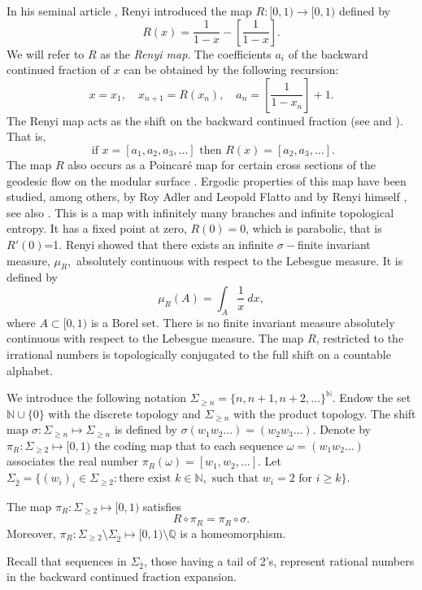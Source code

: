 \documentclass[letterpaper,10pt,reqno]{amsart}
\numberwithin{equation}{section}     %
\newcommand{\N}{\mathbb{N}}
\def\N{{\mathbb N}}
\def\Q{{\mathbb Q}}
\begin{document}
In his seminal article \cite{re}, Renyi  introduced the map $R:[0,1) \to [0,1)$ defined by
\begin{equation}\label{Renyi_form}
R(x)=\frac{1}{1-x} -\left[\frac{1}{1-x} \right].  
\end{equation}
We will refer to $R$ as the \emph{Renyi map}. The coefficients $a_i$ of the backward continued fraction of $x$ can be obtained by the following recursion:
\begin{equation*}
x=x_1,\quad  x_{n+1}=R(x_n),\quad a_n=\left[\frac{1}{1-x_n}\right]+1.
\end{equation*}
The Renyi map acts as the shift on the backward continued fraction (see \cite{ka} and \cite[Chapter 11]{dk}). That is, 
\begin{equation*}
\textrm{ if } x =[a_1, a_2, a_3, \dots] \textrm{ then } R(x)=[a_2, a_3, \dots].
\end{equation*}
The map $R$ also occurs as a Poincar\'e map for certain cross sections of the geodesic flow on the modular surface \cite{af,ka}.  Ergodic properties of this map have been studied, among others, by Roy Adler and Leopold Flatto \cite{af} and by Renyi himself \cite{re}, see also \cite{gh,i1}. This is a map with infinitely many branches and infinite topological entropy. It has a  fixed point at zero, $R(0)=0$, which is parabolic, that is $R'(0)$=1.  Renyi \cite{re} showed that there exists an infinite $\sigma-$finite invariant measure, $\mu_R,$  absolutely continuous with respect to the Lebesgue measure. It is defined by
\[ \mu_R(A) = \int_A \dfrac{1}{x} \ dx, \]
where $A \subset [0,1)$ is a Borel set.  There is no finite  invariant measure absolutely continuous with respect to the Lebesgue measure.  The map $R$, restricted to the irrational numbers is topologically  conjugated to the full shift on a countable alphabet. 

We introduce the following notation $\Sigma_{\geq n}=\{n, n+1, n+2, \dots\}^{\N}$. Endow the set $\N \cup\{0\}$ with the discrete topology and $\Sigma_{\geq n}$ with the product topology. The shift map $\sigma: \Sigma_{\geq n} \mapsto \Sigma_{\geq n}$ is defined by $\sigma(w_1 w_2 \dots)=(w_2 w_3 \dots)$. Denote by $\pi_R:\Sigma_{\geq 2} \mapsto  [0,1)$ the coding map that to each sequence $\omega=(w_1 w_ 2 \dots)$ associates the  real number   $\pi_R(\omega)=[w_1, w_2, \dots]$.  Let $\Sigma_{\bar 2}=\{(w_i)_i \in \Sigma_{\geq 2} : \text{there exist } k \in \N, \text{ such that  }  w_i=2 \text{ for } i \geq k\}$. \begin{lemma} \label{code}
The map $\pi_R:\Sigma_{\geq 2} \mapsto  [0,1)$ satisfies
\begin{equation}
R \circ \pi_R = \pi_R \circ \sigma.
\end{equation}
Moreover,  $\pi_R:\Sigma_{\geq 2}\setminus \Sigma_{\bar 2} \mapsto  [0,1) \setminus \Q$ is a homeomorphism.
\end{lemma}
Recall that sequences in $\Sigma_{\bar 2}$, those having a tail of 2's, represent rational numbers in the backward continued fraction expansion.
\end{document}
